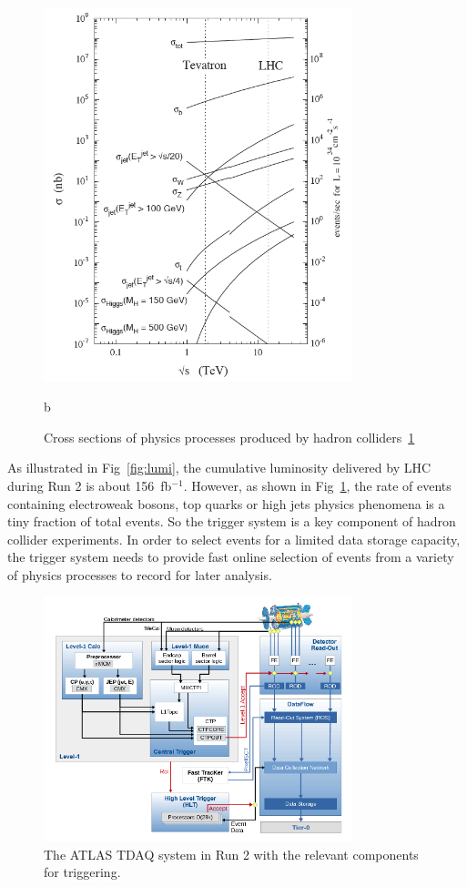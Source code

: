 \begin{figure}[htbp!]
 \centering
 \includegraphics[width=0.8\textwidth]{chapters/c4/figures/cross}
 \caption{b}
 \label{fig:cross}
 \caption{Cross sections of physics processes produced by hadron colliders~\ref{fig:cross}}
\end{figure}
As illustrated in Fig~\ref{fig:lumi}, the cumulative luminosity delivered by LHC during Run 2 is about 156~fb$^{-1}$. However, as shown in Fig~\ref{fig:cross}, the rate of events containing electroweak bosons, top quarks or high \pt jets physics phenomena is a tiny fraction of total events. So the trigger system is a key component of hadron collider experiments. In order to select events for a limited data storage capacity, the trigger system needs to provide fast online selection of events from a variety of physics processes to record for later analysis.
\begin{figure}[htbp!]
 \begin{center}
 \includegraphics[width=0.8\textwidth]{chapters/c4/figures/TDAQ}
 \end{center}
 \caption{The ATLAS TDAQ system in Run 2 with the relevant components for triggering. }
 \label{fig:TDAQ}
\end{figure}

